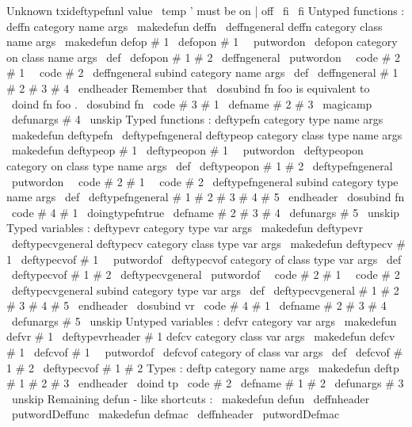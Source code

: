 {{{{{
Unknown
txideftypefnnl
value
\
temp
'
must
be
on
|
off
}
%
\
fi
\
fi
}
%
Untyped
functions
:
%
deffn
category
name
args
\
makedefun
{
deffn
}
{
\
deffngeneral
{
}
}
%
deffn
category
class
name
args
\
makedefun
{
defop
}
#
1
{
\
defopon
{
#
1
\
\
putwordon
}
}
%
\
defopon
{
category
on
}
class
name
args
\
def
\
defopon
#
1
#
2
{
\
deffngeneral
{
\
putwordon
\
\
code
{
#
2
}
}
{
#
1
\
\
code
{
#
2
}
}
}
%
\
deffngeneral
{
subind
}
category
name
args
%
\
def
\
deffngeneral
#
1
#
2
#
3
#
4
\
endheader
{
%
%
Remember
that
\
dosubind
{
fn
}
{
foo
}
{
}
is
equivalent
to
\
doind
{
fn
}
{
foo
}
.
\
dosubind
{
fn
}
{
\
code
{
#
3
}
}
{
#
1
}
%
\
defname
{
#
2
}
{
}
{
#
3
}
\
magicamp
\
defunargs
{
#
4
\
unskip
}
%
}
%
Typed
functions
:
%
deftypefn
category
type
name
args
\
makedefun
{
deftypefn
}
{
\
deftypefngeneral
{
}
}
%
deftypeop
category
class
type
name
args
\
makedefun
{
deftypeop
}
#
1
{
\
deftypeopon
{
#
1
\
\
putwordon
}
}
%
\
deftypeopon
{
category
on
}
class
type
name
args
\
def
\
deftypeopon
#
1
#
2
{
\
deftypefngeneral
{
\
putwordon
\
\
code
{
#
2
}
}
{
#
1
\
\
code
{
#
2
}
}
}
%
\
deftypefngeneral
{
subind
}
category
type
name
args
%
\
def
\
deftypefngeneral
#
1
#
2
#
3
#
4
#
5
\
endheader
{
%
\
dosubind
{
fn
}
{
\
code
{
#
4
}
}
{
#
1
}
%
\
doingtypefntrue
\
defname
{
#
2
}
{
#
3
}
{
#
4
}
\
defunargs
{
#
5
\
unskip
}
%
}
%
Typed
variables
:
%
deftypevr
category
type
var
args
\
makedefun
{
deftypevr
}
{
\
deftypecvgeneral
{
}
}
%
deftypecv
category
class
type
var
args
\
makedefun
{
deftypecv
}
#
1
{
\
deftypecvof
{
#
1
\
\
putwordof
}
}
%
\
deftypecvof
{
category
of
}
class
type
var
args
\
def
\
deftypecvof
#
1
#
2
{
\
deftypecvgeneral
{
\
putwordof
\
\
code
{
#
2
}
}
{
#
1
\
\
code
{
#
2
}
}
}
%
\
deftypecvgeneral
{
subind
}
category
type
var
args
%
\
def
\
deftypecvgeneral
#
1
#
2
#
3
#
4
#
5
\
endheader
{
%
\
dosubind
{
vr
}
{
\
code
{
#
4
}
}
{
#
1
}
%
\
defname
{
#
2
}
{
#
3
}
{
#
4
}
\
defunargs
{
#
5
\
unskip
}
%
}
%
Untyped
variables
:
%
defvr
category
var
args
\
makedefun
{
defvr
}
#
1
{
\
deftypevrheader
{
#
1
}
{
}
}
%
defcv
category
class
var
args
\
makedefun
{
defcv
}
#
1
{
\
defcvof
{
#
1
\
\
putwordof
}
}
%
\
defcvof
{
category
of
}
class
var
args
\
def
\
defcvof
#
1
#
2
{
\
deftypecvof
{
#
1
}
#
2
{
}
}
%
Types
:
%
deftp
category
name
args
\
makedefun
{
deftp
}
#
1
#
2
#
3
\
endheader
{
%
\
doind
{
tp
}
{
\
code
{
#
2
}
}
%
\
defname
{
#
1
}
{
}
{
#
2
}
\
defunargs
{
#
3
\
unskip
}
%
}
%
Remaining
defun
-
like
shortcuts
:
\
makedefun
{
defun
}
{
\
deffnheader
{
\
putwordDeffunc
}
}
\
makedefun
{
defmac
}
{
\
deffnheader
{
\
putwordDefmac
}}}}}
